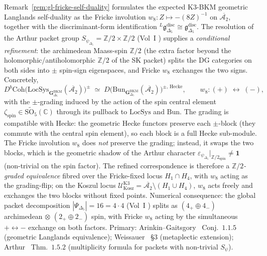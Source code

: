 \begin{remark}
\label{rem:gl-spin-refined-self-duality}
Remark~\ref{rem:gl-fricke-self-duality} formulates the expected
K3-BKM geometric Langlands self-duality as the Fricke involution
$w_8\colon Z\mapsto -(8Z)^{-1}$ on $\overline{\mathcal{A}_2}$, together
with the discriminant-form identification
${}^L\mathfrak{g}_{\Delta_5}^{\mathrm{disc}}
\cong \mathfrak{g}_{\Delta_5}^{\mathrm{disc}}$. The resolution of
the Arthur packet group $S_{\psi_{\Delta_5}}
= \mathbb{Z}/2\times\mathbb{Z}/2$ (Vol~I
\cite{VolI}) supplies a
\emph{conditional refinement}: the archimedean Maass-spin $\mathbb{Z}/2$ (the
extra factor beyond the holomorphic/antiholomorphic $\mathbb{Z}/2$ of
the SK packet) splits the DG categories on both sides into $\pm$
spin-sign eigenspaces, and Fricke $w_8$ exchanges the two signs.
Concretely,
\begin{equation}
\label{eq:gl-spin-refined-gl}
 D^b\mathrm{Coh}\bigl(\mathrm{LocSys}_{\mathbf{G}_{\Delta_5}^{\mathrm{BKM}}}(\overline{\mathcal{A}_2})\bigr)^{\pm}
 \;\simeq\;
 D\bigl(\mathrm{Bun}_{\mathbf{G}_{\Delta_5}^{\mathrm{BKM}}}(\overline{\mathcal{A}_2})\bigr)^{\pm,\,\mathrm{Hecke}},
 \qquad
 w_8\colon (+)\;\longleftrightarrow\;(-),
\end{equation}
with the $\pm$-grading induced by the action of the spin central
element $\zeta_{\mathrm{spin}}\in\widetilde{\mathrm{SO}_5}(\mathbb{C})$
through its pullback to $\mathrm{LocSys}$ and $\mathrm{Bun}$. The
grading is compatible with Hecke: the geometric Hecke functors
preserve each $\pm$-block (they commute with the central spin
element), so each block is a full Hecke sub-module. The Fricke
involution $w_8$ does \emph{not} preserve the grading; instead, it
swaps the two blocks, which is the geometric shadow of the Arthur
character $\varepsilon_{\psi_{\Delta_5}}|_{\mathbb{Z}/2_{\mathrm{spin}}}
\ne \mathbf 1$ (non-trivial on the spin factor). The refined
correspondence is therefore a \emph{$\mathbb{Z}/2$-graded
equivalence} fibred over the Fricke-fixed locus
$H_1\cap H_4$, with $w_8$ acting as the grading-flip; on the Koszul
locus $\mathcal{U}_{\mathrm{Kosz}}^{\mathrm{K3}}
= \overline{\mathcal{A}_2}\setminus(H_1\cup H_4)$, $w_8$ acts freely
and exchanges the two blocks without fixed points. Numerical
consequence: the global packet decomposition
$|\Psi_{\Delta_5}| = 16 = 4\cdot 4$
(Vol~I \cite{VolI}) splits as
$(4_{+}\oplus 4_{-})$ archimedean $\otimes$ $(2_{+}\oplus 2_{-})$
spin, with Fricke $w_8$ acting by the simultaneous $+\leftrightarrow-$
exchange on both factors. Primary: Arinkin--Gaitsgory~\cite{ArinkinGaitsgory2015Singular}
Conj.~$1.1.5$ (geometric Langlands equivalence);
Weissauer~\cite{Weissauer2009GSp4} \S3 (metaplectic extension);
Arthur~\cite{Arthur2013Endoscopic} Thm.~$1.5.2$ (multiplicity formula
for packets with non-trivial $S_\psi$).
\end{remark}

